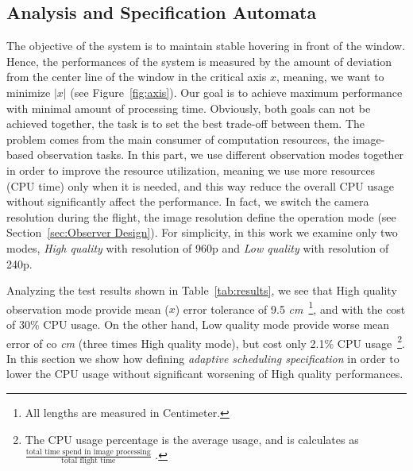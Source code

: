 \documentclass{sig-alternate-ipsn13}
\begin{document}
\subsection{Analysis and Specification Automata}
\label{sec:Analysis}

The objective of the system is to maintain stable hovering in front of the window. Hence, the performances of the system is measured by the amount of deviation from the center line of the window in the critical axis $x$, meaning, we want to minimize $|x|$ (see Figure~\ref{fig:axis}). Our goal is to achieve maximum performance with minimal amount of processing time. Obviously, both goals can not be achieved together, the task is to set the best trade-off between them. The problem comes from the main consumer of computation resources, the image-based observation tasks.
In this part, we use different observation modes together in order to improve the resource utilization, meaning we use more resources (CPU time) only when it is needed, and this way reduce the overall CPU usage without significantly affect the performance.
In fact, we switch the camera resolution during the flight, the image resolution define the operation mode (see Section~\ref{sec:Observer Design}).
For simplicity, in this work we examine only two modes, \textit{High quality} with resolution of 960p and \textit{Low quality} with resolution of 240p.

Analyzing the test results shown in Table~\ref{tab:results}, we see that High quality observation mode provide mean ($x$) error tolerance of 9.5 \textit{cm}~\footnote{All lengths are measured in Centimeter.}, and with the cost of 30\% CPU usage.
On the other hand, Low quality mode provide worse mean error of co \textit{cm} (three times High quality mode), but cost only 2.1\% CPU usage~\footnote{The CPU usage percentage is the average usage, and is calculates as $\frac{\text{total time spend in image processing}}{\text{total flight time}}$ . }.
In this section we show how defining \textit{adaptive scheduling specification} in order to lower the CPU usage without significant worsening of High quality performances.
\end{document}
